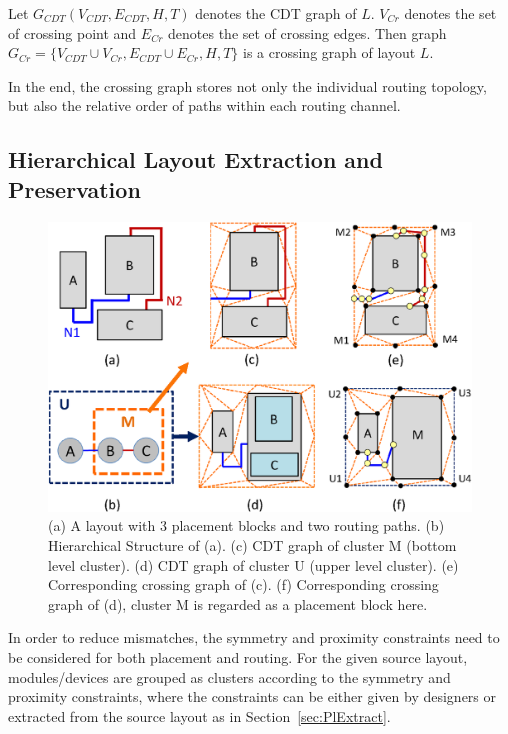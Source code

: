      \begin{defi}\label{defi:CrossGraph}
        Let $G_{CDT}(V_{CDT},E_{CDT},H,T)$ denotes the CDT graph of $L$. $V_{Cr}$ denotes the set of crossing point and $E_{Cr}$ denotes the set of crossing edges. Then graph $G_{Cr} = \{V_{CDT} \cup V_{Cr},E_{CDT} \cup E_{Cr},H,T\}$ is a crossing graph of layout $L$. 
      \end{defi}

      In the end, the crossing graph stores not only the individual routing topology, but also the relative order of paths within each routing channel.

    \subsection{Hierarchical Layout Extraction and Preservation}\label{sec:HLE}

      \begin{figure}[t]
        \begin{center}
        \includegraphics[width=\textwidth]{Fig/Chapter4/HIER.eps}
        \caption{
           (a) A layout with 3 placement blocks and two routing paths. 
           (b) Hierarchical Structure of (a).
           (c) CDT graph of cluster M (bottom level cluster).
           (d) CDT graph of cluster U (upper level cluster).
           (e) Corresponding crossing graph of (c).
           (f) Corresponding crossing graph of (d), cluster M is regarded as a placement block here.
          }
        \label{fig:HIER}
        \end{center}
      \end{figure}

      In order to reduce mismatches, the symmetry and proximity constraints need to be considered for both placement and routing. 
      For the given source layout, modules/devices are grouped as clusters according to the symmetry and proximity constraints, 
      where the constraints can be either given by designers or extracted from the source layout as in Section~\ref{sec:PlExtract}.

